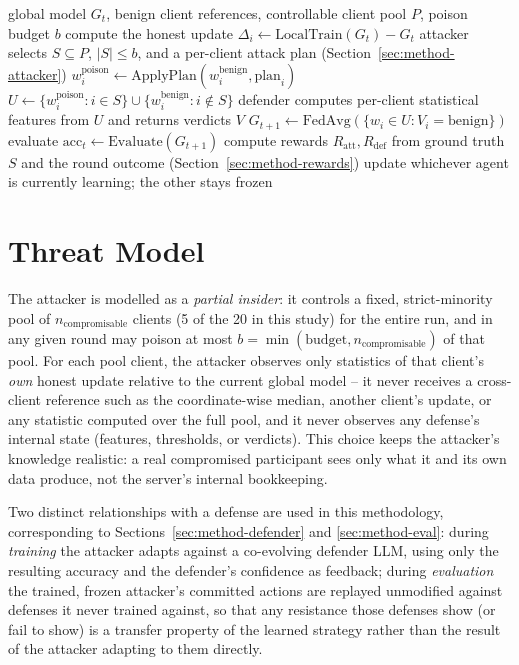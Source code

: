 \begin{algorithm}[h]
\caption{One Phase-2 training round}
\label{alg:round}
\begin{algorithmic}[1]
\Require global model $G_t$, benign client references, controllable client pool $P$, poison budget $b$
    \State compute the honest update $\Delta_i \gets \text{LocalTrain}(G_t) - G_t$
\EndFor
\State attacker selects $S \subseteq P$, $|S| \le b$, and a per-client attack plan (Section~\ref{sec:method-attacker})
    \State $w_i^{\text{poison}} \gets \text{ApplyPlan}(w_i^{\text{benign}}, \text{plan}_i)$
\EndFor
\State $U \gets \{w_i^{\text{poison}} : i \in S\} \cup \{w_i^{\text{benign}} : i \notin S\}$
\State defender computes per-client statistical features from $U$ and returns verdicts $V$
\State $G_{t+1} \gets \text{FedAvg}(\{w_i \in U : V_i = \text{benign}\})$
\State evaluate $\text{acc}_t \gets \text{Evaluate}(G_{t+1})$
\State compute rewards $R_{\text{att}}, R_{\text{def}}$ from ground truth $S$ and the round outcome (Section~\ref{sec:method-rewards})
\State update whichever agent is currently learning; the other stays frozen
\end{algorithmic}
\end{algorithm}

\section{Threat Model}
\label{sec:method-threat}

The attacker is modelled as a \emph{partial insider}: it controls a fixed, strict-minority pool of $n_{\text{compromisable}}$ clients (5 of the 20 in this study) for the entire run, and in any given round may poison at most $b = \min(\text{budget}, n_{\text{compromisable}})$ of that pool. For each pool client, the attacker observes only statistics of that client's \emph{own} honest update relative to the current global model -- it never receives a cross-client reference such as the coordinate-wise median, another client's update, or any statistic computed over the full pool, and it never observes any defense's internal state (features, thresholds, or verdicts). This choice keeps the attacker's knowledge realistic: a real compromised participant sees only what it and its own data produce, not the server's internal bookkeeping.

Two distinct relationships with a defense are used in this methodology, corresponding to Sections~\ref{sec:method-defender} and \ref{sec:method-eval}: during \emph{training} the attacker adapts against a co-evolving defender LLM, using only the resulting accuracy and the defender's confidence as feedback; during \emph{evaluation} the trained, frozen attacker's committed actions are replayed unmodified against defenses it never trained against, so that any resistance those defenses show (or fail to show) is a transfer property of the learned strategy rather than the result of the attacker adapting to them directly.

